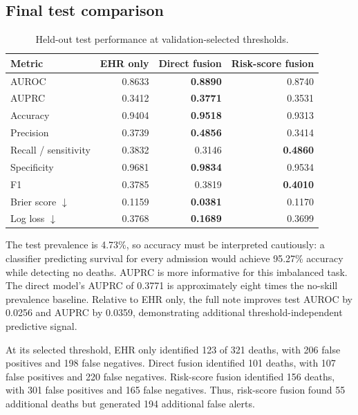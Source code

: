 \documentclass[11pt]{article}
\begin{document}
\subsection{Final test comparison}

\begin{table}[ht]
\centering
\caption{Held-out test performance at validation-selected thresholds.}
\label{tab:test-results}
\begin{tabular}{lrrr}
\toprule
\rowcolor{lightblue}
Metric & EHR only & Direct fusion & Risk-score fusion \\
\midrule
AUROC               & 0.8633 & \textbf{0.8890} & 0.8740 \\
AUPRC               & 0.3412 & \textbf{0.3771} & 0.3531 \\
Accuracy            & 0.9404 & \textbf{0.9518} & 0.9313 \\
Precision           & 0.3739 & \textbf{0.4856} & 0.3414 \\
Recall / sensitivity& 0.3832 & 0.3146 & \textbf{0.4860} \\
Specificity         & 0.9681 & \textbf{0.9834} & 0.9534 \\
F1                  & 0.3785 & 0.3819 & \textbf{0.4010} \\
Brier score $\downarrow$ & 0.1159 & \textbf{0.0381} & 0.1170 \\
Log loss $\downarrow$    & 0.3768 & \textbf{0.1689} & 0.3699 \\
\bottomrule
\end{tabular}
\end{table}

The test prevalence is 4.73\%, so accuracy must be interpreted cautiously: a
classifier predicting survival for every admission would achieve 95.27\%
accuracy while detecting no deaths. AUPRC is more informative for this imbalanced
task. The direct model's AUPRC of 0.3771 is approximately eight times the no-skill
prevalence baseline. Relative to EHR only, the full note improves test AUROC by
0.0256 and AUPRC by 0.0359, demonstrating additional threshold-independent
predictive signal.

At its selected threshold, EHR only identified 123 of 321 deaths, with 206 false
positives and 198 false negatives. Direct fusion identified 101 deaths, with 107
false positives and 220 false negatives. Risk-score fusion identified 156 deaths,
with 301 false positives and 165 false negatives. Thus, risk-score fusion found 55
additional deaths but generated 194 additional false alerts.
\end{document}
